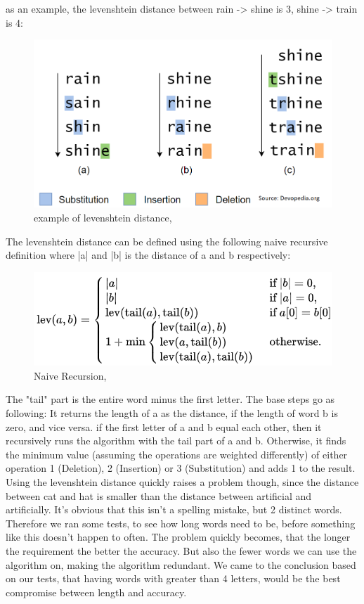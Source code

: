 as an example, the levenshtein distance between rain -> shine is 3, shine -> train is 4:
\begin{figure}[H]
  \centering
  \includegraphics[scale = 0.6]{figures/levenshtein_example.png}
  \caption{example of levenshtein distance, \cite{levenshtein_distance}}
\end{figure}

The levenshtein distance can be defined using the following naive recursive definition where |a| and |b| is the distance of a and b respectively:
\begin{figure}[H]
  \centering
  \includegraphics[scale = 0.7]{figures/levenshtein_recursive.png}
  \caption{Naive Recursion, \cite{levenshtein_recursive_definition}}
\end{figure}
The "tail" part is the entire word minus the first letter.
The base steps go as following: It returns the length of a as the distance, if the length of word b is zero, and vice versa.
if the first letter of a and b equal each other, then it recursively runs the algorithm with the tail part of a and b.
Otherwise, it finds the minimum value (assuming the operations are weighted differently) of either operation 1 (Deletion), 2 (Insertion) or 3 (Substitution) and adds 1 to the result. \\

Using the levenshtein distance quickly raises a problem though, since the distance between cat and hat is smaller than the distance
between artificial and artificially. 
It's obvious that this isn't a spelling mistake, but 2 distinct words. Therefore we ran
some tests, to see how long words need to be, before something like this doesn't happen to often. 
The problem quickly becomes, that the longer the requirement the better the accuracy. 
But also the fewer words we can use the algorithm on, making the algorithm redundant.
We came to the conclusion based on our tests, that having words with greater than 4 letters, would be
the best compromise between length and accuracy. \\

